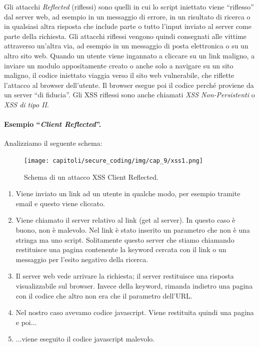 Gli attacchi \textit{Reflected} (riflessi) sono quelli in cui lo script iniettato viene ``riflesso'' dal server web, ad esempio in un messaggio di errore, in un risultato di ricerca o in qualsiasi altra risposta che
include parte o tutto l'input inviato al server come parte della richiesta.
Gli attacchi riflessi vengono quindi consegnati alle vittime attraverso un'altra via, ad esempio in un
messaggio di posta elettronica o su un altro sito web.
Quando un utente viene ingannato a cliccare su un link maligno, a inviare un modulo appositamente creato o anche solo a navigare su un sito maligno, il codice
iniettato viaggia verso il sito web vulnerabile, che riflette l'attacco al browser dell'utente.
Il browser esegue poi il codice perché proviene da un server ``di fiducia''.
Gli XSS riflessi sono anche chiamati \textit{XSS Non-Persistenti} o \textit{XSS di tipo II}.

\newpage

\paragraph{Esempio ``\textit{Client Reflected}''.}
Analizziamo il seguente schema:

\begin{figure}[H]
      \centering
      \texttt{[image: capitoli/secure\_coding/img/cap\_9/xss1.png]}
      \caption{Schema di un attacco XSS Client Reflected.}
\end{figure}

\begin{enumerate}
      \item Viene inviato un link ad un utente in qualche modo, per esempio
            tramite email e
            questo viene cliccato.
      \item Viene chiamato il server relativo al link (get al server).
            In questo caso è buono, non è
            malevolo. Nel link è stato inserito un parametro che non è una stringa
            ma uno script.
            Solitamente questo server che stiamo chiamando restituisce una
            pagina contenente la keyword
            cercata con il link
            o un messaggio per l'esito negativo della ricerca.
      \item Il server web vede arrivare la richiesta; il server restituisce una
            risposta visualizzabile
            sul browser. Invece della keyword, rimanda indietro una pagina con il codice
            che
            altro non era che il parametro dell'URL.
      \item Nel nostro caso avevamo codice javascript.
            Viene restituita quindi una pagina e poi...
      \item ...viene eseguito il codice javascript malevolo.
\end{enumerate}

